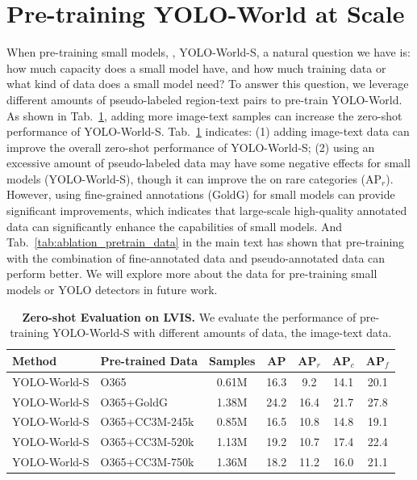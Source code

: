 \documentclass[10pt,twocolumn,letterpaper]{article}
\newcommand{\name}{YOLO-World}
\begin{document}
\section{Pre-training \name{} at Scale}
When pre-training small models, \eg, \name{}-S, a natural question we have is: how much capacity does a small model have, and how much training data or what kind of data does a small model need?
To answer this question, we leverage different amounts of pseudo-labeled region-text pairs to pre-train \name{}.
As shown in Tab.~\ref{tab:zero_shot_yolos}, adding more image-text samples can increase the zero-shot performance of \name{}-S.
Tab.~\ref{tab:zero_shot_yolos} indicates: (1) adding image-text data can improve the overall zero-shot performance of \name{}-S; (2) using an excessive amount of pseudo-labeled data may have some negative effects for small models (\name{}-S), though it can improve the on rare categories (AP$_r$).
However, using fine-grained annotations (GoldG) for small models can provide significant improvements, which indicates that large-scale high-quality annotated data can significantly enhance the capabilities of small models.
And Tab.~\ref{tab:ablation_pretrain_data} in the main text has shown that pre-training with the combination of fine-annotated data and pseudo-annotated data can perform better. We will explore more about the data for pre-training small models or YOLO detectors in future work.

\begin{table}[h]
    \centering
    \renewcommand\arraystretch{1.2}
    {\begin{tabular}{llc cccc}
    \toprule
    Method & Pre-trained Data & Samples & AP & AP$_r$ & AP$_c$ & AP$_f$\\
    \hline
    \name{}-S & O365 & 0.61M & 16.3 & 9.2 & 14.1 & 20.1 \\
    \name{}-S & O365+GoldG & 1.38M & 24.2 & 16.4 & 21.7 & 27.8 \\
    \hline
    \name{}-S & O365+CC3M-245k & 0.85M & 16.5 & 10.8 & 14.8 & 19.1 \\
    \name{}-S & O365+CC3M-520k & 1.13M & 19.2 & 10.7 & 17.4 & 22.4 \\
    \name{}-S & O365+CC3M-750k & 1.36M & 18.2 & 11.2 & 16.0 & 21.1 \\
    \bottomrule
    \end{tabular}}
    \vspace{-4pt}
    \caption{\textbf{Zero-shot Evaluation on LVIS.} We evaluate the performance of pre-training \name{}-S with different amounts of data, the image-text data.}
    \label{tab:zero_shot_yolos}
\end{table}


% 
\end{document}
